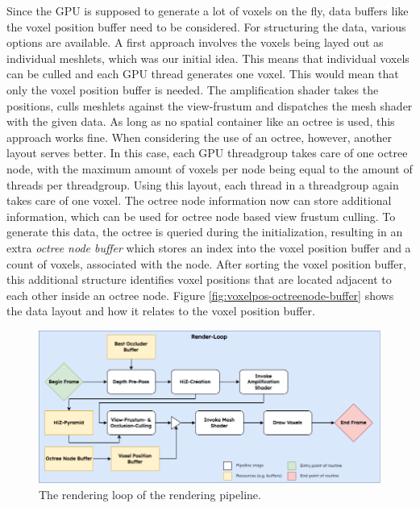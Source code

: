 \noindent
Since the \ac{GPU} is supposed to generate a lot of voxels on the fly, data buffers like the voxel position buffer 
need to be considered.
For structuring the data, various options are available. A first approach involves the voxels being layed 
out as individual meshlets, which was our initial idea. This means that individual voxels can be culled and 
each \ac{GPU} thread generates one voxel. This would mean that only the voxel position buffer is needed. 
The amplification shader takes the positions, culls meshlets against the view-frustum and dispatches the 
mesh shader with the given data. As long as no spatial container like an octree is used, this approach works 
fine. When considering the use of an octree, however, another layout serves better. In this case, each \ac{GPU} 
threadgroup takes care of one octree node, with the maximum amount of voxels per node being equal to the 
amount of threads per threadgroup. Using this layout, each thread in a threadgroup again takes care of one 
voxel. The octree node information now can store additional information, which can be used for octree node 
based view frustum culling. To generate this data, the octree is queried during the initialization, resulting 
in an extra \emph{octree node buffer} which stores an index into the voxel position buffer and a count of voxels,
associated with the node. After sorting the voxel position buffer, this additional structure identifies voxel 
positions that are located adjacent to each other inside an octree node. Figure \ref{fig:voxelpos-octreenode-buffer} 
shows the data layout and how it relates to the voxel position buffer. 

\begin{figure}[h]
    \centering
    \includegraphics[width=\linewidth]{images/graphics/render-loop.png}
    \caption{The rendering loop of the rendering pipeline.}
    \label{fig:pipeline-loop}
\end{figure}



